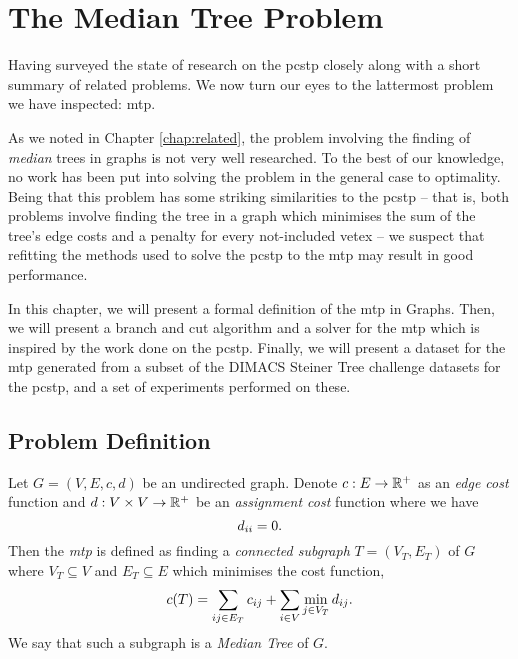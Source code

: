 \chapter{The Median Tree Problem}\label{chap:mediantree}
Having surveyed the state of research on the \gls{pcstp} closely along with a
short summary of related problems. We now turn our eyes to the lattermost problem we have inspected:
\gls{mtp}.

As we noted in Chapter \ref{chap:related}, the problem involving the finding of \textit{median} trees
in graphs is not very well researched. To the best of our knowledge, no work has been put into solving
the problem in the general case to optimality. Being that this problem has some striking similarities
to the \gls{pcstp} -- that is, both problems involve finding the tree in a graph which minimises the sum
of the tree's edge costs and a penalty for every not-included vetex -- we suspect that refitting the
methods used to solve the \gls{pcstp} to the \gls{mtp} may result in good performance.

In this chapter, we will present a formal definition of the \acrlong{mtp} in Graphs. Then,
we will present a branch and cut algorithm and a solver for the \gls{mtp} which is inspired by the
work done on the \gls{pcstp}. Finally, we will present a dataset for the \gls{mtp} generated from a subset
of the DIMACS Steiner Tree challenge datasets for the \gls{pcstp}\citep{DIMACS},
and a set of experiments performed
on these.
 
\section{Problem Definition}

Let $G = (V, E, c, d)$ be an undirected graph. Denote $c : E \to \mathbb{R}^+$ as an \textit{edge cost} function
and $d : V \times V  \to \mathbb{R}^+$ be an \textit{assignment cost} function where we have
$$d_{ii} = 0 \mathnormal{.}$$
Then the \textit{\acrlong{mtp}}
is defined as finding a \textit{connected subgraph} $T = (V_T, E_T)$ of $G$
where $V_T \subseteq V$ and
$E_T \subseteq E$ which minimises the cost function,
$$c(T) = \sum_{ij \in E_T} c_{ij} + \sum_{i \in V} \min_{j \in V_T} d_{ij}\mathnormal{.}$$
We say that such a subgraph is a \textit{Median Tree} of $G$.

